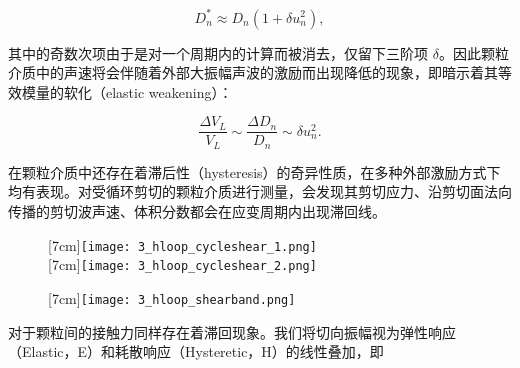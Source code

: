 \begin{equation}
  D_{n}^{*} \approx D_{n}(1 + \delta u_{n}^{2}),
\end{equation}

其中的奇数次项由于是对一个周期内的计算而被消去，仅留下三阶项 $\delta$。因此颗粒介质中的声速将会伴随着外部大振幅声波的激励而出现降低的现象，即暗示着其等效模量的软化（elastic weakening）\cite{PhysRevE.84.020301}：

\begin{equation}
  \frac{\Delta V_{L}}{V_{L}} \sim \frac{\Delta D_{n}}{D_{n}}\sim \delta u_{n}^{2}.
\end{equation}

在颗粒介质中还存在着滞后性（hysteresis）的奇异性质，在多种外部激励方式下均有表现。对受循环剪切的颗粒介质进行测量，会发现其剪切应力、沿剪切面法向传播的剪切波声速、体积分数都会在应变周期内出现滞回线\cite{PhysRevE.85.051302,PhysRevLett.126.048002}。

\begin{figure}[!hbtp]
  \centering
	\begin{minipage}[!hbtp]{0.48\columnwidth}
		\centering
		[7cm]{\texttt{[image: 3\_hloop\_cycleshear\_1.png]}}
		\\
    [7cm]{\texttt{[image: 3\_hloop\_cycleshear\_2.png]}}
	\end{minipage}
	\begin{minipage}[!hbtp]{0.48\columnwidth}
		\centering
    [7cm]{\texttt{[image: 3\_hloop\_shearband.png]}}
	\end{minipage}
\end{figure}

对于颗粒间的接触力同样存在着滞回现象。我们将切向振幅视为弹性响应（Elastic，E）和耗散响应（Hysteretic，H）的线性叠加，即

